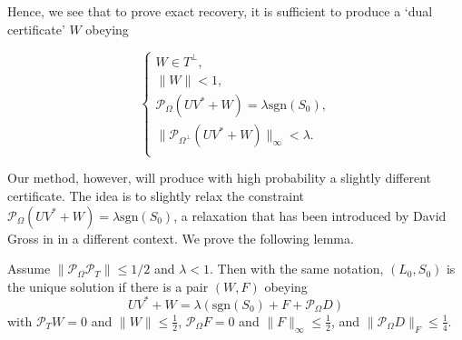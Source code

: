 Hence, we see that to prove exact recovery, it is sufficient to produce a `dual certificate' $W$ obeying

\begin{equation}
\label{eq:dual-certif}
\begin{cases} W \in T^\perp, \\
  \|W\| < 1,\\
  \mathcal{P}_{\Omega}(UV^* + W) = \lambda \textrm{sgn}(S_0),\\
  \|\mathcal{P}_{\Omega^\perp}(UV^* + W)\|_\infty < \lambda.\\
\end{cases}
\end{equation}

Our method, however, will produce with high probability a slightly different certificate. The idea is to slightly relax the constraint
$\mathcal{P}_{\Omega}(UV^* + W) = \lambda \textrm{sgn}(S_0)$, a relaxation that has been introduced by David Gross in \cite{GrossMC} in a different context. We prove the following lemma.

\begin{lemma}
\label{teo:kktdg}
Assume $\|\mathcal{P}_{\Omega}\mathcal{P}_T\| \le 1/2$ and $\lambda < 1$.  Then with the same notation, $(L_0, S_0)$ is the unique solution if there is a pair $(W, F)$ obeying
\[
UV^* + W = \lambda(\textrm{sgn}(S_0) + F + \mathcal{P}_{\Omega} D)
\]
with $\mathcal{P}_T W = 0$ and $\|W\| \le \frac12$, $\mathcal{P}_{\Omega} F = 0$ and
$\|F\|_\infty \le \frac12$, and $\|\mathcal{P}_{\Omega} D\|_F \le \frac{1}{4}$.
\end{lemma}

